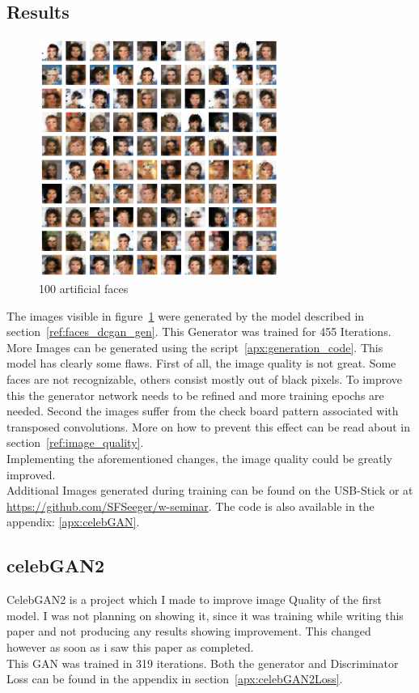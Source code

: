 \subsection{Results}
\begin{figure}[H]
    \centering
    \includegraphics[width=0.7\textwidth]{images/faces.png}
    \caption{100 artificial faces}
    \label{fig:faces_dcgan}
\end{figure}
The images visible in figure~\ref{fig:faces_dcgan} were generated by the model described in section~\ref{ref:faces_dcgan_gen}. This Generator was trained for 455 Iterations. More Images can be generated using the script~\ref{apx:generation_code}.
This model has clearly some flaws. First of all, the image quality is not great. Some faces are not recognizable, others consist mostly out of black pixels. To improve this the generator network needs to be refined and more training epochs are needed. Second the images suffer from the check board pattern associated with transposed convolutions. More on how to prevent this effect can be read about in section~\ref{ref:image_quality}.\\
Implementing the aforementioned changes, the image quality could be greatly improved.\\
Additional Images generated during training can be found on the USB-Stick or at \url{https://github.com/SFSeeger/w-seminar}. The code is also available in the appendix: \ref{apx:celebGAN}.

\subsection{celebGAN2}
CelebGAN2 is a project which I made to improve image Quality of the first model. I was not planning on showing it, since it was training while writing this paper and not producing any results showing improvement. This changed however as soon as i saw this paper as completed. \\
This GAN was trained in 319 iterations. Both the generator and Discriminator Loss can be found in the appendix in section~\ref{apx:celebGAN2Loss}.
